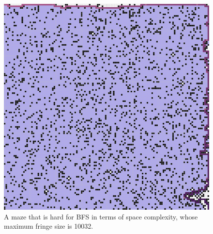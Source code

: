 \documentclass[letter]{article}
\begin{document}
\begin{enumerate}[resume]
\begin{enumerate}
\begin{enumerate}
\begin{figure}
					\includegraphics[width=\textwidth]{../pics/df/10032_2.png}
					\caption{\label{fig:df1}A maze that is hard for BFS in terms of space complexity, whose maximum fringe size is 10032. }
					

\end{figure}
\end{enumerate}
\end{enumerate}
\end{enumerate}
\end{document}
